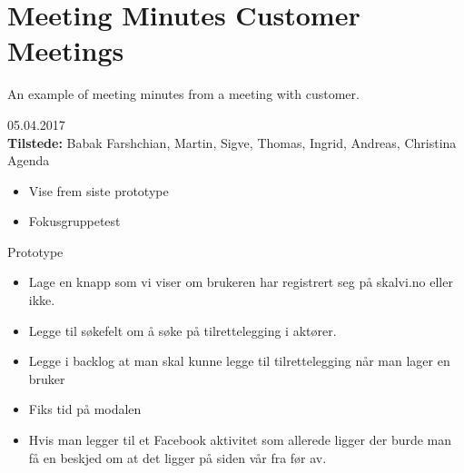 \section{Meeting Minutes Customer Meetings}
\label{meeting_minutes_customer_meetings}

An example of meeting minutes from a meeting with customer.

{\huge{05.04.2017}}\\
\textbf{Tilstede:} Babak Farshchian, Martin, Sigve, Thomas, Ingrid, Andreas, Christina\\

{\Large{Agenda}}
\begin{itemize} 
    \item Vise frem siste prototype
    \item Fokusgruppetest
\end{itemize} 


{\large{Prototype}}
\begin{itemize}  
    \item Lage en knapp som vi viser om brukeren har registrert seg på skalvi.no eller ikke.
    \item Legge til søkefelt om å søke på tilrettelegging i aktører.
    \item Legge i backlog at man skal kunne legge til tilrettelegging når man lager en bruker
    \item Fiks tid på modalen
    \item Hvis man legger til et Facebook aktivitet som allerede ligger der burde man få en beskjed om at det ligger på siden vår fra før av.
\end{itemize}

